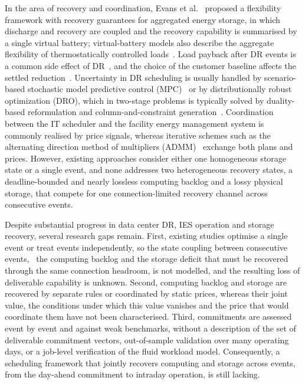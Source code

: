 In the area of recovery and coordination, Evans et al.~\cite{evans2022} proposed a flexibility framework with recovery
guarantees for aggregated energy storage, in which discharge and recovery are coupled and the recovery capability is
summarised by a single virtual battery; virtual-battery models also describe the aggregate flexibility of
thermostatically controlled loads~\cite{hao2015}. Load payback after DR events is a common side effect of
DR~\cite{wrinch2012}, and the choice of the customer baseline affects the settled reduction~\cite{chao2011}.
Uncertainty in DR scheduling is usually handled by scenario-based stochastic model predictive control
(MPC)~\cite{schildbach2014} or by distributionally robust optimization (DRO), which in two-stage problems is typically
solved by duality-based reformulation and column-and-constraint generation~\cite{zhang2026bilevel,zeng2013,esfahani2018}.
Coordination between the IT scheduler and the facility energy management system is commonly realised by price signals,
whereas iterative schemes such as the alternating direction method of multipliers (ADMM)~\cite{boyd2011} exchange both
plans and prices. However, existing approaches consider either one homogeneous storage state or a single event, and
none addresses two heterogeneous recovery states, a deadline-bounded and nearly lossless computing backlog and a lossy
physical storage, that compete for one connection-limited recovery channel across consecutive events.

Despite substantial progress in data center DR, IES operation and storage recovery, several research gaps remain.
First, existing studies optimise a single event or treat events independently, so the state coupling between
consecutive events, \ie\ the computing backlog and the storage deficit that must be recovered through the same
connection headroom, is not modelled, and the resulting loss of deliverable capability is unknown. Second, computing
backlog and storage are recovered by separate rules or coordinated by static prices, whereas their joint value, the
conditions under which this value vanishes and the price that would coordinate them have not been characterised.
Third, commitments are assessed event by event and against weak benchmarks, without a description of the set of
deliverable commitment vectors, out-of-sample validation over many operating days, or a job-level verification of the
fluid workload model. Consequently, a scheduling framework that jointly recovers computing and storage across events,
from the day-ahead commitment to intraday operation, is still lacking.


